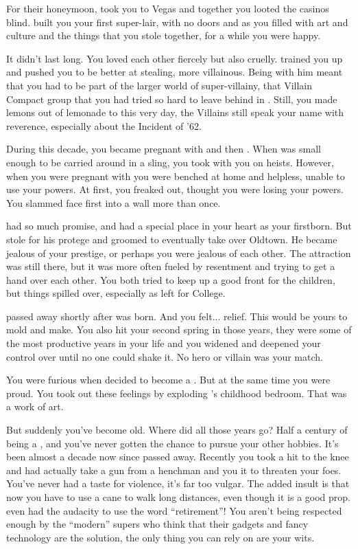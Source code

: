 \documentclass[char]{LRSguildcamp1}
\begin{document}
For their honeymoon, \cGS{\they} took you to Vegas and together you looted the casinos blind. \cGS{\They} built you your first super-lair, with no doors and as you filled with art and culture and the things that you stole together, for a while you were happy. 

It didn't last long. You loved each other fiercely but also cruelly. \cGS{} trained you up and pushed you to be better at stealing, more villainous. Being with him meant that you had to be part of the larger world of super-villainy, that Villain Compact group that you had tried so hard to leave behind in \pSuperSchool. Still, you made lemons out of lemonade to this very day, the Villains still speak your name with reverence, especially about the Incident of '62. 

During this decade, you became pregnant with \cOldest{} and then \cArchitect{}. When \cOldest{} was small enough to be carried around in a sling, you took \cOldest{\them} with you on heists. However, when you were pregnant with \cArchitect{} you were benched at home and helpless, unable to use your powers.  At first, you freaked out, thought you were losing your powers. You slammed face first into a wall more than once.

\cOldest{} had so much promise, and had a special place in your heart as your firstborn. But \cGS{} stole \cOldest{} for his protege and groomed \cOldest{\them} to eventually take over Oldtown. He became jealous of your prestige, or perhaps you were jealous of each other. The attraction was still there, but it was more often fueled by resentment and trying to get a hand over each other.  You both tried to keep up a good front for the children, but things spilled over, especially as \cOldest{} left for College. 

\cGS{} passed away shortly after \cYoungest{} was born. And you felt... relief. This \cYoungest{\offspring} would be yours to mold and make. You also hit your second spring in those years, they were some of the most productive years in your life and you widened and deepened your control over \pCityGrandma{} until no one could shake it. No hero or villain was your match. 

You were furious when \cYoungest{} decided to become a \cYoungest{\hero}. But at the same time you were proud. You took out these feelings by exploding \cYoungest{}’s childhood bedroom. That was a work of art. 

But suddenly you’ve become old. Where did all those years go? Half a century of being a \cGrandma{\villain}, and you’ve never gotten the chance to pursue your other hobbies. It’s been almost a decade now since \cGS{\they} passed away. Recently you took a hit to the knee and had actually take a gun from a henchman and you it to threaten your foes. You’ve never had a taste for violence, it’s far too vulgar. The added insult is that now you have to use a cane to walk long distances, even though it is a good prop. \cOldest{} even had the audacity to use the word “retirement”! You aren’t being respected enough by the “modern” supers who think that their gadgets and fancy technology are the solution, the only thing you can rely on are your wits. 
\end{document}

